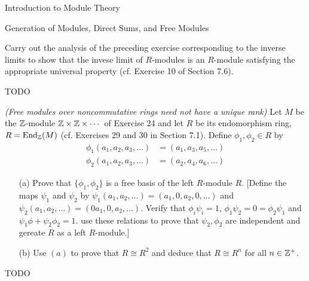 \begin{chapter}{Introduction to Module Theory}
\begin{section}{Generation of Modules, Direct Sums, and Free Modules}
\begin{solution}
\end{solution}\oneperpage



\begin{problem}\label{ex:10.3.26}
Carry out the analysis of the preceding exercise corresponding to the inverse limits to show that the invese limit of $R$-modules is an $R$-module satisfying the appropriate universal property (cf. Exercise 10 of Section 7.6).
\end{problem}
\begin{solution}TODO

\end{solution}\oneperpage



\begin{problem}\label{ex:10.3.27}
\emph{(Free modules over noncommutative rings need not have a unique rank)} Let $M$ be the $\mathbb{Z}$-module $\mathbb{Z}\times \mathbb{Z}\times \cdots$ of Exercise 24 and let $R$ be its endomorphism ring, $R = \operatorname{End}_{\mathbb{Z}}(M)$ (cf. Exercises 29 and 30 in Section 7.1). Define $\phi_1,\phi_2\in R$ by \begin{align*}
\phi_1(a_1,a_2,a_3,\ldots)&=(a_1,a_3,a_5,\ldots)\\
\phi_2(a_1,a_2,a_3,\ldots)&=(a_2,a_4,a_6,\ldots)
\end{align*}
\begin{enumerate}
\item[(a)] Prove that $\{\phi_1,\phi_2\}$ is a free basis of the left $R$-module $R$. [Define the maps $\psi_1$ and $\psi_2$ by $\psi_1(a_1,a_2,\ldots) =(a_1,0,a_2,0,\ldots)$ and $\psi_2(a_1,a_2,\ldots) =(0a_1,0,a_2,\ldots)$. Verify that $\phi_i\psi_i = 1$, $\phi_1\psi_2 = 0 = \phi_2\psi_1$ and $\psi_1\phi+\psi_2\phi_2 = 1$. use these relations to prove that $\psi_2,\phi_2$ are independent and gereate $R$ as a left $R$-module.]
\item[(b)] Use $(a)$ to prove that $R\cong R^2$ and deduce that $R\cong R^n$ for all $n\in \mathbb{Z}^+$.
\end{enumerate}
\end{problem}
\begin{solution}TODO

\end{solution}\oneperpage



\end{section}










\end{chapter}
